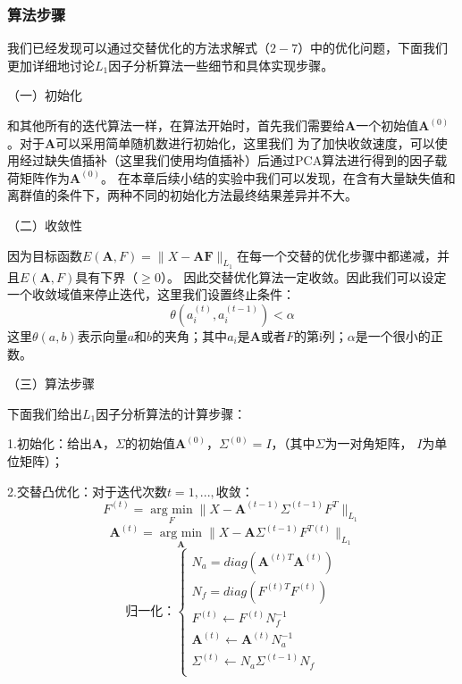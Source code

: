 \subsubsection{算法步骤}
我们已经发现可以通过交替优化的方法求解式（$2-7$）中的优化问题，下面我们更加详细地讨论$L_1$因子分析算法一些细节和具体实现步骤。

（一）初始化

和其他所有的迭代算法一样，在算法开始时，首先我们需要给$\bm{A}$一个初始值$\bm{A}^{(0)}$。对于$\bm{A}$可以采用简单随机数进行初始化，这里我们
为了加快收敛速度，可以使用经过缺失值插补（这里我们使用均值插补）后通过PCA算法进行得到的因子载荷矩阵作为$\bm{A}^{(0)}$。
在本章后续小结的实验中我们可以发现，在含有大量缺失值和离群值的条件下，两种不同的初始化方法最终结果差异并不大。

（二）收敛性

因为目标函数$E(\bm{A}, F) = \|X - \bm{A}\bm{F}\|_{L_1}$在每一个交替的优化步骤中都递减，并且$E(\bm{A},F)$具有下界（$\geq 0$）。
因此交替优化算法一定收敛。因此我们可以设定一个收敛域值来停止迭代，这里我们设置终止条件：
    $$ \theta(a_i^{(t)}, a_i^{(t-1)}) <  \alpha $$
这里$\theta(a, b)$表示向量$a$和$b$的夹角；其中$a_i$是$\bm{A}$或者$F$的第i列；$\alpha$是一个很小的正数。

（三）算法步骤

下面我们给出$L_1$因子分析算法的计算步骤：

1.初始化：给出$\bm{A}$，$\Sigma$的初始值$\bm{A}^{(0)}$，$\Sigma^{(0)} = I$，（其中$\Sigma$为一对角矩阵，
$I$为单位矩阵）；

2.交替凸优化：对于迭代次数$t = 1, ..., $收敛：
$$F^{(t)} = \underset{F}{\operatorname{arg\ min}} \|X - \bm{A}^{(t-1)}\Sigma^{(t-1)}F^{T}\|_{L_1}$$
$$\bm{A}^{(t)} = \underset{\bm{A}}{\operatorname{arg\ min}} \|X - \bm{A}\Sigma^{(t-1)}F^{T(t)} \|_{L_1}$$
\begin{equation*}
    \text{归一化：}\left\{
                 \begin{array}{clr}
                 N_a = diag(\bm{A}^{(t)T}\bm{A}^{(t)})\\
                 N_f = diag(F^{(t)T}F^{(t)})\\
                 F^{(t)} \leftarrow F^{(t)}N_f^{-1}\\
                 \bm{A}^{(t)}\leftarrow \bm{A}^{(t)}N_a^{-1}\\
                 \Sigma^{(t)} \leftarrow N_a\Sigma^{(t-1)}N_f\\
                 \end{array}
    \right.
\end{equation*}

